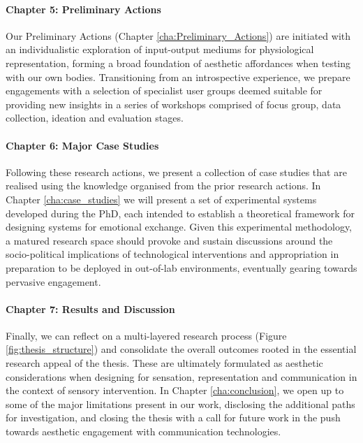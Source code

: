\paragraph{Chapter 5: Preliminary Actions}

Our Preliminary Actions (Chapter \ref{cha:Preliminary_Actions}) are initiated with an individualistic exploration of input-output mediums for physiological representation, forming a broad foundation of aesthetic affordances when testing with our own bodies. Transitioning from an introspective experience, we prepare engagements with a selection of specialist user groups deemed suitable for providing new insights in a series of workshops comprised of focus group, data collection, ideation and evaluation stages.

\paragraph{Chapter 6: Major Case Studies}

Following these research actions, we present a collection of case studies that are realised using the knowledge organised from the prior research actions. In Chapter \ref{cha:case_studies} we will present a set of experimental systems developed during the PhD, each intended to establish a theoretical framework for designing systems for emotional exchange. Given this experimental methodology, a matured research space should provoke and sustain discussions around the socio-political implications of technological interventions and appropriation in preparation to be deployed in out-of-lab environments, eventually gearing towards pervasive engagement.

\paragraph{Chapter 7: Results and Discussion}

Finally, we can reflect on a multi-layered research process (Figure \ref{fig:thesis_structure}) and consolidate the overall outcomes rooted in the essential research appeal of the thesis. These are ultimately formulated as aesthetic considerations when designing for sensation, representation and communication in the context of sensory intervention. In Chapter \ref{cha:conclusion}, we open up to some of the major limitations present in our work, disclosing the additional paths for investigation, and closing the thesis with a call for future work in the push towards aesthetic engagement with communication technologies.

